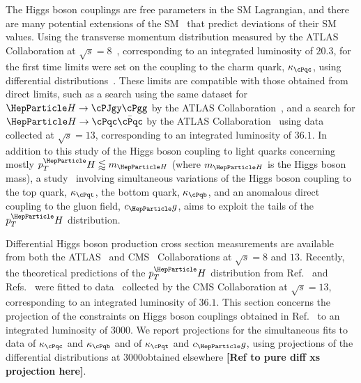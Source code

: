 \documentclass[../report.tex]{subfiles}
\newcommand{\pt}{\ensuremath{p_T}\xspace}
\newcommand{\hboson}{\ensuremath{\PH}\xspace}
\newcommand{\bquark}{\ensuremath{\cPqb}\xspace}
\newcommand{\cquark}{\ensuremath{\cPqc}\xspace}
\newcommand{\tquark}{\ensuremath{\cPqt}\xspace}
\newcommand{\photon}{\ensuremath{\cPgg}\xspace}
\newcommand{\jpsi}{\ensuremath{\cPJgy}\xspace}
\newcommand{\cc}{\ensuremath{\cquark\bar{\cquark}}\xspace}
\newcommand{\hcc}{\ensuremath{\hboson\to\cc}\xspace}
\newcommand{\pth}{\ensuremath{\pt^\hboson}\xspace}
\newcommand{\mH}{\ensuremath{m_{\hboson}}\xspace}
\newcommand{\cg}{\ensuremath{c_\Pg}\xspace}
\newcommand{\kappab}{\ensuremath{\kappa_{\bquark}}\xspace}
\newcommand{\kappac}{\ensuremath{\kappa_{\cquark}}\xspace}
\newcommand{\kappat}{\ensuremath{\kappa_{\tquark}}\xspace}
\begin{document}
The Higgs boson couplings are free parameters in the SM Lagrangian, and there are many potential extensions of the SM~\cite{Dimopoulos:1981zb,Witten:1981nf} that predict deviations of their SM values.
% 
Using the transverse momentum distribution measured by the ATLAS Collaboration at $\sqrt{s}=8$\TeV~\cite{Aad:2015lha}, corresponding to an integrated luminosity of $20.3$\fbinv, for the first time limits were set on the coupling to the charm quark, $\kappac$, using differential distributions~\cite{Bishara:2016jga}.
% 
These limits are compatible with those obtained from direct limits, such as a search using the same dataset for $\PH\to\jpsi\photon$ by the ATLAS Collaboration~\cite{Aad:2015sda}, and a search for $\hcc$ by the ATLAS Collaboration~\cite{Aaboud:2018fhh} using data collected at $\sqrt{s}=13$\TeV, corresponding to an integrated luminosity of $36.1$\fbinv.
% 
In addition to this study of the Higgs boson coupling to light quarks concerning mostly $\pth \lessapprox \mH$ (where $\mH$ is the Higgs boson mass), a study~\cite{Grazzini:2017szg,Grazzini:2016paz} involving simultaneous variations of the Higgs boson coupling to the top quark, $\kappat$, the bottom quark, $\kappab$, and an anomalous direct coupling to the gluon field, $\cg$, aims to exploit the tails of the $\pth$ distribution.



Differential Higgs boson production cross section measurements are available from both the ATLAS~\cite{%
Aad:2014lwa,%
Aad:2014tca,%
Aad:2016lvc,%
Aaboud:2018xdt,%
Aaboud:2017oem,%
Aaboud:2018ezd%
} and CMS~\cite{%
Khachatryan:2015rxa,%
Khachatryan:2015yvw,%
Khachatryan:2016vnn,%
Sirunyan:2018kta,%
CMS_AN_2016-442,%
CMS-PAS-HIG-17-028%
} Collaborations at $\sqrt{s}=8$ and $13$\TeV.
% 
Recently, the  theoretical predictions of the $\pth$ distribution from Ref.~\cite{Bishara:2016jga} and Refs.~\cite{Grazzini:2017szg,Grazzini:2016paz} were fitted to data~\cite{CMS-PAS-HIG-17-028} collected by the CMS Collaboration at $\sqrt{s}=13$\TeV, corresponding to an integrated luminosity of $36.1$\fbinv.
% 
This section concerns the projection of the constraints on Higgs boson couplings obtained in Ref.~\cite{CMS-PAS-HIG-17-028} to an integrated luminosity of $3000$\fbinv.
% 
We report projections for the simultaneous fits to data of $\kappac$ and $\kappab$ and of $\kappat$ and $\cg$, using projections of the differential distributions at $3000$\fbinv obtained elsewhere \textbf{[Ref to pure diff xs projection here]}.
\end{document}
